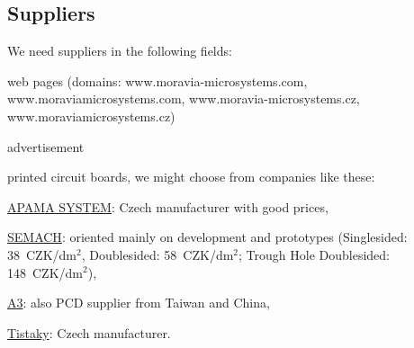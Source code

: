 \documentclass[a4paper,twoside,15pt]{book}
\begin{document}
        \subsection{Suppliers}
            We need suppliers in the following fields:
                \begin{dinglist}{73}
                    \item web pages (domains: www.moravia-microsystems.com, www.moraviamicrosystems.com, www.moravia-microsystems.cz, www.moraviamicrosystems.cz)
                    \item advertisement
                    \item printed circuit boards, we might choose from companies like these:
                    \begin{dinglist}{75}
                        \item \href{http://www.apama.cz/}{APAMA SYSTEM}: Czech manufacturer with good prices,
                        \item \href{http://www.semach.cz/}{SEMACH}: oriented mainly on development and prototypes (Singlesided: 38~CZK/dm$^2$, Doublesided: 58~CZK/dm$^2$; Trough Hole Doublesided: 148~CZK/dm$^2$),
                        \item \href{http://www.a3.cz}{A3}: also PCD supplier from Taiwan and China,
                        \item \href{http://www.tistaky.cz/}{Tistaky}: Czech manufacturer.
                    \end{dinglist}
                \end{dinglist}
\end{document}
